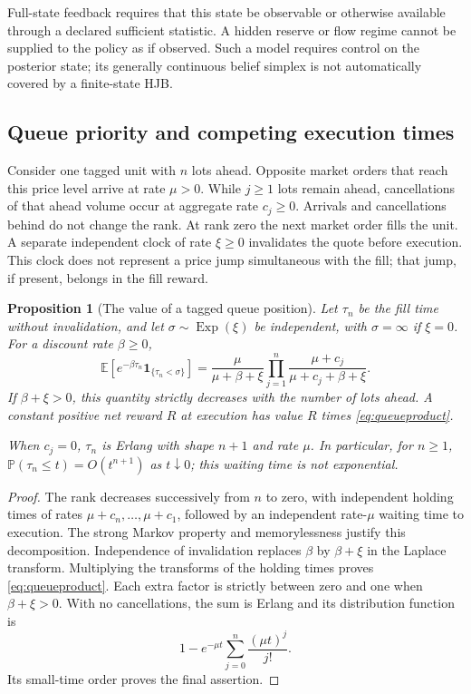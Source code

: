 \documentclass[11pt]{article}
\theoremstyle{plain}
\newtheorem{proposition}[theorem]{Proposition}
\theoremstyle{definition}
\theoremstyle{remark}
\newcommand{\E}{\mathbb E}
\begin{document}
Full-state feedback requires that this state be observable or otherwise
available through a declared sufficient statistic. A hidden reserve or
flow regime cannot be supplied to the policy as if observed. Such a
model requires control on the posterior state; its generally continuous
belief simplex is not automatically covered by a finite-state HJB.

\subsection{Queue priority and competing execution times}

Consider one tagged unit with \(n\) lots ahead. Opposite market orders
that reach this price level arrive at rate \(\mu>0\).
While \(j\ge1\) lots remain ahead,
cancellations of that ahead volume occur at aggregate rate \(c_j\ge0\).
Arrivals and cancellations behind do not change the rank. At rank zero
the next market order fills the unit. A separate independent clock of
rate \(\xi\ge0\) invalidates the quote before execution. This clock
does not represent a price jump simultaneous with the fill; that jump,
if present, belongs in the fill reward.

\begin{proposition}[The value of a tagged queue position]
\label{prop:taggedqueue}
Let \(\tau_n\) be the fill time without invalidation, and let
\(\sigma\sim\operatorname{Exp}(\xi)\) be independent, with
\(\sigma=\infty\) if \(\xi=0\). For a discount rate \(\beta\ge0\),
\begin{equation}\label{eq:queueproduct}
\E[e^{-\beta\tau_n}\mathbf1_{\{\tau_n<\sigma\}}]
=\frac{\mu}{\mu+\beta+\xi}
  \prod_{j=1}^n\frac{\mu+c_j}{\mu+c_j+\beta+\xi}.
\end{equation}
If \(\beta+\xi>0\), this quantity strictly decreases with the number
of lots ahead. A constant positive net reward \(R\) at execution
has value \(R\) times \eqref{eq:queueproduct}.

When \(c_j=0\), \(\tau_n\) is Erlang with shape \(n+1\) and rate
\(\mu\). In particular, for \(n\ge1\),
\(\mathbb P(\tau_n\le t)=O(t^{n+1})\) as \(t\downarrow0\);
this waiting time is not exponential.
\end{proposition}
\begin{proof}
The rank decreases successively from \(n\) to zero, with independent
holding times of rates \(\mu+c_n,\ldots,\mu+c_1\), followed by an
independent rate-\(\mu\) waiting time to execution. The strong Markov
property and memorylessness justify this decomposition. Independence
of invalidation replaces \(\beta\) by \(\beta+\xi\) in the Laplace
transform. Multiplying the transforms of the holding times proves
\eqref{eq:queueproduct}. Each extra factor is strictly between zero
and one when \(\beta+\xi>0\). With no cancellations, the sum is
Erlang and its distribution function is
\[
1-e^{-\mu t}\sum_{j=0}^{n}\frac{(\mu t)^j}{j!}.
\]
Its small-time order proves the final assertion.
\end{proof}
\end{document}
